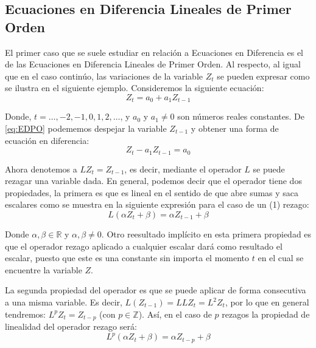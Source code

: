 \documentclass[
]{book}
\begin{document}
\hypertarget{ecuaciones-en-diferencia-lineales-de-primer-orden}{%
\subsection{Ecuaciones en Diferencia Lineales de Primer Orden}\label{ecuaciones-en-diferencia-lineales-de-primer-orden}}

El primer caso que se suele estudiar en relación a Ecuaciones en Diferencia es el de las Ecuaciones en Diferencia Lineales de Primer Orden. Al respecto, al igual que en el caso continúo, las variaciones de la variable \(Z_t\) se pueden expresar como se ilustra en el siguiente ejemplo. Consideremos la siguiente ecuación:
\begin{equation}
    Z_t = a_0 + a_1 Z_{t-1}
    \label{eq:EDPO}
\end{equation}

Donde, \(t = \ldots, -2, -1, 0, 1, 2, \ldots\), y \(a_0\) y \(a_1 \neq 0\) son números reales constantes. De \eqref{eq:EDPO} podememos despejar la variable \(Z_{t-1}\) y obtener una forma de ecuación en diferencia:
\begin{equation}
    Z_t - a_1 Z_{t-1} = a_0
    \label{eq:EDPO2}
\end{equation}

Ahora denotemos a \(L Z_t = Z_{t-1}\), es decir, mediante el operador \(L\) se puede rezagar una variable dada. En general, podemos decir que el operador tiene dos propiedades, la primera es que es lineal en el sentido de que abre sumas y saca escalares como se muestra en la siguiente expresión para el caso de un (1) rezago:
\begin{equation}
    L(\alpha Z_{t} + \beta) = \alpha Z_{t-1} + \beta
    \label{eq:E1Lag}
\end{equation}

Donde \(\alpha, \beta \in \mathbb{R}\) y \(\alpha, \beta \neq 0\). Otro reesultado implícito en esta primera propiedad es que el operador rezago aplicado a cualquier escalar dará como resultado el escalar, puesto que este es una constante sin importa el momento \(t\) en el cual se encuentre la variable \(Z\).

La segunda propiedad del operador es que se puede aplicar de forma consecutiva a una misma variable. Es decir, \(L ( Z_{t-1}) = L L Z_{t} = L^2 Z_{t}\), por lo que en general tendremos: \(L^p Z_t = Z_{t-p}\) (con \(p \in \mathbb{Z}\)). Así, en el caso de \(p\) rezagos la propiedad de linealidad del operador rezago será:
\begin{equation}
    L^p (\alpha Z_{t} + \beta) = \alpha Z_{t-p} + \beta
   \label{eq:LinProp}
\end{equation}
\end{document}
